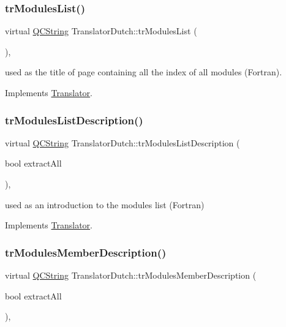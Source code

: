 \subsubsection{\texorpdfstring{trModulesList()}{trModulesList()}}
{\footnotesize\ttfamily virtual \mbox{\hyperlink{class_q_c_string}{Q\+C\+String}} Translator\+Dutch\+::tr\+Modules\+List (\begin{DoxyParamCaption}{ }\end{DoxyParamCaption})\hspace{0.3cm}{\ttfamily [inline]}, {\ttfamily [virtual]}}

used as the title of page containing all the index of all modules (Fortran). 

Implements \mbox{\hyperlink{class_translator}{Translator}}.

\mbox{\label{class_translator_dutch_abe5b90add520d21b50eeecf3f3182933}} 
\subsubsection{\texorpdfstring{trModulesListDescription()}{trModulesListDescription()}}
{\footnotesize\ttfamily virtual \mbox{\hyperlink{class_q_c_string}{Q\+C\+String}} Translator\+Dutch\+::tr\+Modules\+List\+Description (\begin{DoxyParamCaption}\item[{bool}]{extract\+All }\end{DoxyParamCaption})\hspace{0.3cm}{\ttfamily [inline]}, {\ttfamily [virtual]}}

used as an introduction to the modules list (Fortran) 

Implements \mbox{\hyperlink{class_translator}{Translator}}.

\mbox{\label{class_translator_dutch_a086e97ab20b6f54418a90b74c838c78e}} 
\subsubsection{\texorpdfstring{trModulesMemberDescription()}{trModulesMemberDescription()}}
{\footnotesize\ttfamily virtual \mbox{\hyperlink{class_q_c_string}{Q\+C\+String}} Translator\+Dutch\+::tr\+Modules\+Member\+Description (\begin{DoxyParamCaption}\item[{bool}]{extract\+All }\end{DoxyParamCaption})\hspace{0.3cm}{\ttfamily [inline]}, {\ttfamily [virtual]}}

